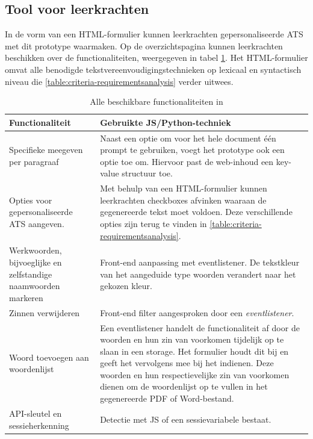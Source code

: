 \subsection{Tool voor leerkrachten}

In de vorm van een HTML-formulier kunnen leerkrachten gepersonaliseerde ATS met dit prototype waarmaken. Op de overzichtspagina kunnen leerkrachten beschikken over de functionaliteiten, weergegeven in tabel \ref{table:functionaliteiten-leerkrachten}. Het HTML-formulier omvat alle benodigde tekstvereenvoudigingstechnieken op lexicaal en syntactisch niveau die \ref{table:criteria-requirementsanalysis} verder uitwees. 

\begin{center}
	\begin{table}
		\begin{tabular}{ | m{7cm} | m{7cm} } 
			\hline
			\textbf{Functionaliteit} & Gebruikte JS/Python-techniek \\
			\hline
			Specifieke meegeven per paragraaf & Naast een optie om voor het hele document één prompt te gebruiken, voegt het prototype ook een optie toe om. Hiervoor past de web-inhoud een key-value structuur toe. \\
			\hline
			Opties voor gepersonaliseerde ATS aangeven. & Met behulp van een HTML-formulier kunnen leerkrachten checkboxes afvinken waaraan de gegenereerde tekst moet voldoen. Deze verschillende opties zijn terug te vinden in \ref{table:criteria-requirementsanalysis}. \\
			\hline
			Werkwoorden, bijvoeglijke en zelfstandige naamwoorden markeren & Front-end aanpassing met eventlistener. De tekstkleur van het aangeduide type woorden verandert naar het gekozen kleur. \\
			\hline
			Zinnen verwijderen & Front-end filter aangesproken door een \textit{eventlistener}. \\
			\hline
			Woord toevoegen aan woordenlijst & Een eventlistener handelt de functionaliteit af door de woorden en hun zin van voorkomen tijdelijk op te slaan in een storage. Het formulier houdt dit bij en geeft het vervolgens mee bij het indienen. Deze woorden en hun respectievelijke zin van voorkomen dienen om de woordenlijst op te vullen in het gegenereerde PDF of Word-bestand.\\ 
			\hline
			API-sleutel en sessieherkenning & Detectie met JS of een sessievariabele bestaat.
			\hline 
		\end{tabular}
	\caption{Alle beschikbare functionaliteiten in }
	\label{table:functionaliteiten-leerkrachten}
	\end{table}
\end{center}



